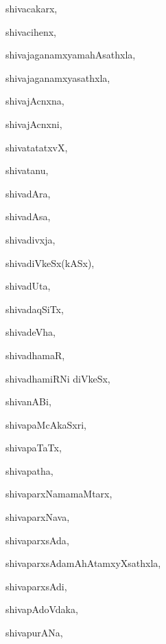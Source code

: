 \begin{multicols}{3}
{\noindent
{shivacakarx}, \pageref{shivacakarx}

\noindent
{shivacihenx}, \pageref{shivacihenx}

\noindent
{shivajaganamxyamahAsathxla}, \pageref{shivajaganamxyamahAsathxla}

\noindent
{shivajaganamxyasathxla}, \pageref{shivajaganamxyasathxla}

\noindent
{shivajAcnxna}, \pageref{shivajAcnxna}

\noindent
{shivajAcnxni}, \pageref{shivajAcnxni}

\noindent
{shivatatatxvX}, \pageref{shivatatatxvX}

\noindent
{shivatanu}, \pageref{shivatanu}

\noindent
{shivadAra}, \pageref{shivadAra}

\noindent
{shivadAsa}, \pageref{shivadAsa}

\noindent
{shivadivxja}, \pageref{shivadivxja}

\noindent
{shivadiVkeSx(kASx)}, \pageref{shivadiVkeSxkASx}

\noindent
{shivadUta}, \pageref{shivadUta}

\noindent
{shivadaqSiTx}, \pageref{shivadaqSiTx}

\noindent
{shivadeVha}, \pageref{shivadeVha}

\noindent
{shivadhamaR}, \pageref{shivadhamaR}

\noindent
{shivadhamiRNi diVkeSx}, \pageref{shivadhamiRNidiVkeSx}

\noindent
{shivanABi}, \pageref{shivanABi}

\noindent
{shivapaMcAkaSxri}, \pageref{shivapaMcAkaSxri}

\noindent
{shivapaTaTx}, \pageref{shivapaTaTx}

\noindent
{shivapatha}, \pageref{shivapatha}

\noindent
{shivaparxNamamaMtarx}, \pageref{shivaparxNamamaMtarx}

\noindent
{shivaparxNava}, \pageref{shivaparxNava}

\noindent
{shivaparxsAda}, \pageref{shivaparxsAda}

\noindent
{shivaparxsAdamAhAtamxyXsathxla}, \pageref{shivaparxsAdamAhAtamxyXsathxla}

\noindent
{shivaparxsAdi}, \pageref{shivaparxsAdi}

\noindent
{shivapAdoVdaka}, \pageref{shivapAdoVdaka}

\noindent
{shivapurANa}, \pageref{shivapurANa}

}
\end{multicols}
